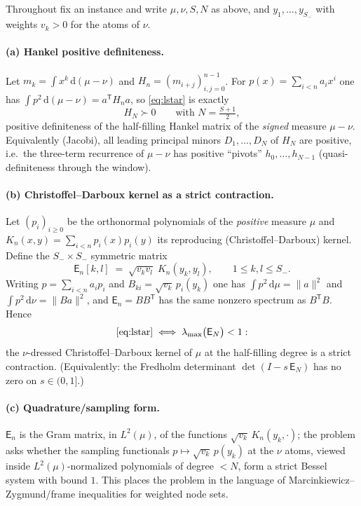 \documentclass[11pt]{article}
\theoremstyle{remark}
\newcommand{\dd}{\,\mathrm{d}}
\newcommand{\E}{\mathsf{E}}
\begin{document}
Throughout fix an instance and write $\mu,\nu,S,N$ as above, and
$y_{1},\dots,y_{S_{-}}$ with weights $v_{k}>0$ for the atoms of
$\nu$.

\paragraph{(a) Hankel positive definiteness.}
Let $m_{k}=\int x^{k}\dd(\mu-\nu)$ and
$H_{n}=(m_{i+j})_{i,j=0}^{n-1}$.  For $p(x)=\sum_{i<n}a_{i}x^{i}$ one
has $\int p^{2}\dd(\mu-\nu)=a^{\mathsf T}H_{n}a$, so
\eqref{eq:lstar} is exactly
\[
H_{N}\succ 0
\qquad\text{with } N=\tfrac{S+1}{2},
\]
positive definiteness of the half-filling Hankel matrix of the
\emph{signed} measure $\mu-\nu$.  Equivalently (Jacobi), all leading
principal minors $D_{1},\dots,D_{N}$ of $H_{N}$ are positive, i.e.\
the three-term recurrence of $\mu-\nu$ has positive ``pivots''
$h_{0},\dots,h_{N-1}$ (quasi-definiteness through the window).

\paragraph{(b) Christoffel--Darboux kernel as a strict contraction.}
Let $(p_{i})_{i\ge 0}$ be the orthonormal polynomials of the
\emph{positive} measure $\mu$ and
$K_{n}(x,y)=\sum_{i<n}p_{i}(x)p_{i}(y)$ its reproducing
(Christoffel--Darboux) kernel.  Define the $S_{-}\times S_{-}$
symmetric matrix
\[
\E_{n}[k,l]\;=\;\sqrt{v_{k}v_{l}}\;K_{n}(y_{k},y_{l}),
\qquad 1\le k,l\le S_{-}.
\]
Writing $p=\sum_{i<n}a_{i}p_{i}$ and $B_{ki}=\sqrt{v_{k}}\,
p_{i}(y_{k})$ one has $\int p^{2}\dd\mu=\lVert a\rVert^{2}$ and
$\int p^{2}\dd\nu=\lVert Ba\rVert^{2}$, and
$\E_{n}=BB^{\mathsf T}$ has the same nonzero spectrum as
$B^{\mathsf T}B$.  Hence
\[
\eqref{eq:lstar}
\iff
\lambda_{\max}\bigl(\E_{N}\bigr)<1 :
\]
the $\nu$-dressed Christoffel--Darboux kernel of $\mu$ at the
half-filling degree is a strict contraction.  (Equivalently: the
Fredholm determinant $\det(I-s\,\E_{N})$ has no zero on $s\in(0,1]$.)

\paragraph{(c) Quadrature/sampling form.}
$\E_{n}$ is the Gram matrix, in $L^{2}(\mu)$, of the functions
$\sqrt{v_{k}}\,K_{n}(y_{k},\cdot)$; the problem asks whether the
sampling functionals $p\mapsto\sqrt{v_{k}}\,p(y_{k})$ at the $\nu$
atoms, viewed inside $L^{2}(\mu)$-normalized polynomials of degree
$<N$, form a strict Bessel system with bound $1$.  This places the
problem in the language of Marcinkiewicz--Zygmund/frame inequalities
for weighted node sets.
\end{document}
